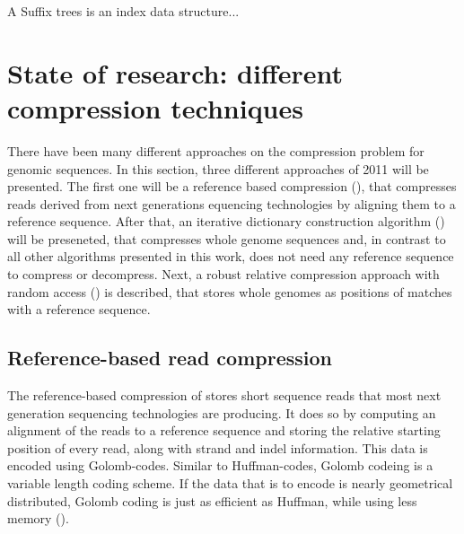 \documentclass[acmtocl,acmnow]{article}
\begin{document}

A Suffix trees is an index data structure... 

\section{State of research: different compression techniques}

There have been many different approaches on the compression problem for genomic sequences. In this section, three
different approaches of 2011 will be presented. The first one will be a reference based compression (\cite{FriLeiCho}),
that compresses reads derived from next generations equencing technologies by aligning them to a reference sequence.
After that, an iterative dictionary construction algorithm (\cite{Kur}) will be preseneted, that compresses whole genome
sequences and, in contrast to all other
algorithms presented in this work, does not need any reference sequence to compress or decompress.
Next, a robust relative compression approach with random access (\cite{DeoGra}) is described, that stores whole genomes
as positions of matches with a reference sequence.

\subsection{Reference-based read compression}

The reference-based compression of \cite{FriLeiCho} stores short sequence reads that most next generation sequencing
technologies are producing. It does so by computing an alignment of the reads to a reference sequence and storing 
the relative starting position of every read, along with strand and indel information. This data is encoded using
Golomb-codes. Similar to Huffman-codes, Golomb codeing is a variable length coding scheme. If the data that is to encode
is nearly geometrical distributed, Golomb coding is just as efficient as Huffman, while using less memory (\cite{Gol}).
\end{document}
